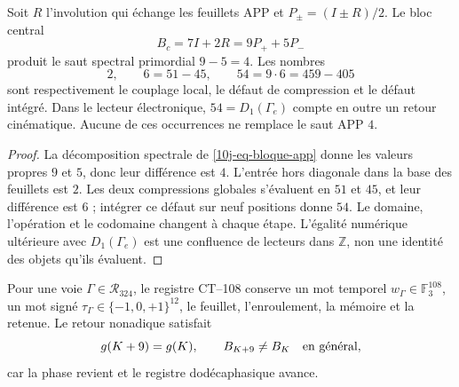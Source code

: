 \begin{proposition}
\label{10j-prop-cuatro-cincuentaycuatro}
Soit \(R\) l'involution qui échange les feuillets APP et \(P_\pm=(I\pm R)/2\). Le bloc central
\begin{equation}
 B_c=7I+2R=9P_++5P_-
 \label{10j-eq-bloque-app}
\end{equation}
produit le saut spectral primordial \(9-5=4\). Les nombres
\begin{equation}
 2,\qquad 6=51-45,\qquad
 54=9\cdot6=459-405
 \label{10j-eq-despliegue-2-6-54}
\end{equation}
sont respectivement le couplage local, le défaut de compression et le défaut intégré. Dans le lecteur électronique, \(54=D_1(\Gamma_e)\) compte en outre un retour cinématique. Aucune de ces occurrences ne remplace le saut APP \(4\).
\end{proposition}

\begin{proof}
La décomposition spectrale de \eqref{10j-eq-bloque-app} donne les valeurs propres \(9\) et \(5\), donc leur différence est \(4\). L'entrée hors diagonale dans la base des feuillets est \(2\). Les deux compressions globales s'évaluent en \(51\) et \(45\), et leur différence est \(6\) ; intégrer ce défaut sur neuf positions donne \(54\). Le domaine, l'opération et le codomaine changent à chaque étape. L'égalité numérique ultérieure avec \(D_1(\Gamma_e)\) est une confluence de lecteurs dans \(\mathbb Z\), non une identité des objets qu'ils évaluent.
\end{proof}

Pour une voie \(\Gamma\in\mathcal R_{324}\), le registre CT--108 conserve un mot temporel \(w_\Gamma\in\mathbb F_3^{108}\), un mot signé \(\tau_\Gamma\in\{-1,0,+1\}^{12}\), le feuillet, l'enroulement, la mémoire et la retenue. Le retour nonadique satisfait
\begin{equation}
 g(K+9)=g(K),\qquad B_{K+9}\ne B_K\quad\hbox{en général},
 \label{10j-eq-retorno-memoria}
\end{equation}
car la phase revient et le registre dodécaphasique avance.

